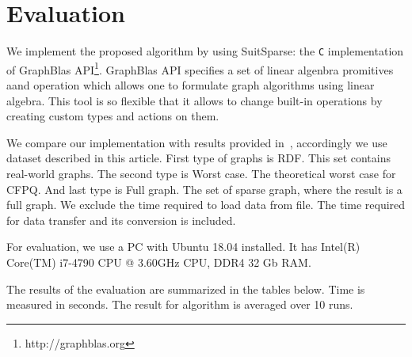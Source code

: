 \section{Evaluation}

We implement the proposed algorithm by using SuitSparse: the \verb|C| implementation of GraphBlas API\footnote{http://graphblas.org}. GraphBlas API specifies a set of linear algenbra promitives aand operation which allows one to formulate graph algorithms using linear algebra. This tool is so flexible that it allows to change built-in operations by creating custom types and actions on them.


We compare our implementation with results provided in~\cite{10.1145/3327964.3328503}, accordingly we use dataset described in this article. First type of graphs is RDF. This set contains real-world graphs. The second type is Worst case. The theoretical worst case for CFPQ. And last type is Full graph. The set of sparse graph, where the result is a full graph. We exclude the time required to load data from file. The time required for data transfer and its conversion is included.

For evaluation, we use a PC with Ubuntu 18.04 installed. It has Intel(R) Core(TM) i7-4790 CPU @ 3.60GHz CPU, DDR4 32 Gb RAM.



The results of the evaluation are summarized in the tables below.
Time is measured in seconds. The result for algorithm is averaged over 10 runs.

